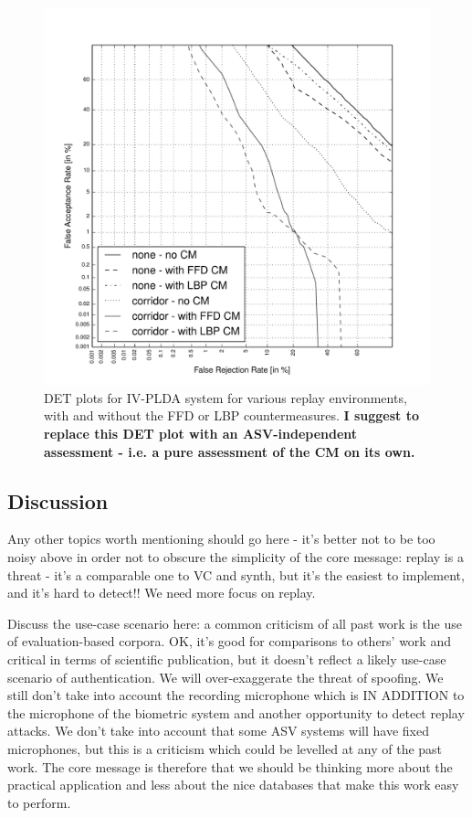 \begin{figure}
	\centering
\includegraphics[width=1\linewidth]{Figs/DET_IVPLDA_counter_iPad.pdf}
	\caption{DET plots for IV-PLDA system for various replay environments, with and without the FFD or LBP countermeasures. {\bfseries  I suggest to replace this DET plot with an ASV-independent assessment - i.e. a pure assessment of the CM on its own.}}
	\label{fig::DETs_CM}
\end{figure}



\subsection{Discussion}

Any other topics worth mentioning should go here - it's better not to be too noisy above in order not to obscure the simplicity of the core message: replay is a threat - it's a comparable one to VC and synth, but it's the easiest to implement, and it's hard to detect!!  We need more focus on replay.

Discuss the use-case scenario here: a common criticism of all past work is the use of evaluation-based corpora.  OK, it's good for comparisons to others' work and critical in terms of scientific publication, but it doesn't reflect a likely use-case scenario of authentication.  We will over-exaggerate the threat of spoofing.  We still don't take into account the recording microphone which is IN ADDITION to the microphone of the biometric system and another opportunity to detect replay attacks.  We don't take into account that some ASV systems will have fixed microphones, but this is a criticism which could be levelled at any of the past work.  The core message is therefore that we should be thinking more about the practical application and less about the nice databases that make this work easy to perform.


